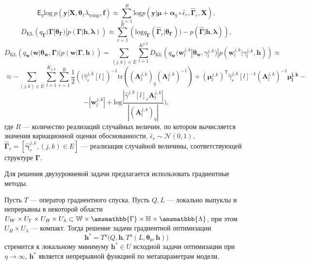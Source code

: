 \[
   \mathsf{E}_q \text{log}~p(\mathbf{y}|\mathbf{X}, \boldsymbol{\theta}_1 \lambda_{\text{temp}}, \mathbf{f}) \approx   \sum_{r=1}^R \text{log}p(\mathbf{y}|\boldsymbol{\mu}+\boldsymbol{\alpha}_q \circ \hat{\epsilon}_r, \hat{\boldsymbol{\Gamma}}_r, \mathbf{X}),
\]
\[
D_\text{KL}\left(q_{\boldsymbol{\Gamma}}(\boldsymbol{\Gamma}|\boldsymbol{\theta}_{\boldsymbol{\Gamma}})|p(\boldsymbol{\Gamma}|\mathbf{h}, \boldsymbol{\lambda})\right)   \approx  \sum_{r=1}^R \left(\text{log}q_{\boldsymbol{\Gamma}}(\hat{\boldsymbol{\Gamma}}_r|\boldsymbol{\theta}_{\boldsymbol{\Gamma}})) - p(\hat{\boldsymbol{\Gamma}}|\mathbf{h},\boldsymbol{\lambda})\right),
\]
\[
D_\text{KL}\left(q_{\mathbf{w}}(\mathbf{w}|\boldsymbol{\theta}_\mathbf{w},\boldsymbol{\Gamma})|p(\mathbf{w}|\boldsymbol{\Gamma}, \mathbf{h})\right)  =  \sum_{(j,k) \in E}\sum_{l=1}^{K^{j,k}} D_\text{KL}\left(q_{\mathbf{w}}(\mathbf{w}^{j,k}_l|\boldsymbol{\theta}_\mathbf{w},\gamma^{j,k}_l)|p(\mathbf{w}^{j,k}_l|\gamma^{j,k}_l, \mathbf{h})\right)\approx
\]
\[ 
\approx-\sum_{(j,k) \in E}\sum_{l=1}^{K_{j,k}}\sum_{r=1}^R\frac{1}{2}\left( (\hat{\gamma}^{j,k}_r[l]\right)^{-1}\text{tr}((\mathbf{A}^{j,k}_l)_q(\mathbf{A}^{j,k}_l)^{-1}) + (\boldsymbol{\mu}^{j,k}_l)^{\mathsf{T}}\hat{\gamma}^{j,k}_r[l]^{-1}(\mathbf{A}^{j,k}_l)^{-1}\boldsymbol{\mu^{j,k}_l} -
\]
\[
- |\mathbf{w}^{j,k}_l| + \text{log}\frac{|\hat{\gamma}^{j,k}[l]_r\mathbf{A}^{j,k}_l|}{|(\mathbf{A}^{j,k}_l)_q|}),
\]
где $R$ --- количество реализаций случайных величин, по котором вычисляется значения вариационной оценки обоснованности, $\hat{\epsilon}_r \sim \mathcal{N}(0,1),$
 $\hat{\boldsymbol{\Gamma}}_r = [\hat{\boldsymbol{\gamma}}^{j,k}_r, (j,k) \in E]$ --- реализация случайной величины, соответствующей структуре $\boldsymbol{\Gamma}$.

Для решения двухуровневой задачи предлагается использовать градиентные методы. 
\begin{theorem}
Пусть $T$ --- оператор градиентного спуска.
Пусть $Q,L$ --- локально выпуклы и непрерывны в некоторой области $U_{W} \times U_{\Gamma} \times U_H \times U_\lambda \subset \mathbb{W}\times\amsmathbb{\Gamma}\times\mathbb{H}\times\amsmathbb{\Lambda}$, при  этом $U_H \times U_\lambda$ --- компакт. 
Тогда решение задачи градиентной оптимизации 
\[
     \mathbf{h}^{*} = T^\eta\bigl(Q, \mathbf{h}, T^\eta(L, \boldsymbol{\theta}_0, \mathbf{h})\bigr)
\] 
стремится к локальному минимуму  $\mathbf{h}^{*} \in U$ исходной задачи оптимизации при $\eta \to \infty$,
$\mathbf{h}^{*}$ является непрерывной функцией по метапараметрам модели.
\end{theorem}

